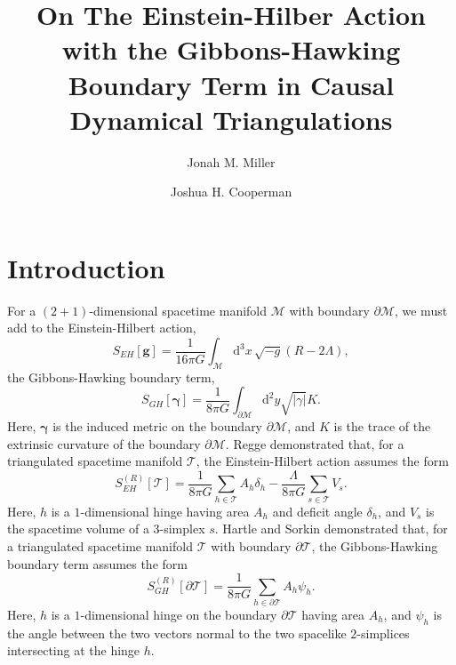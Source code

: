 \documentclass{article}
\title{On The Einstein-Hilber Action with the Gibbons-Hawking Boundary Term in Causal Dynamical Triangulations}
\author{Jonah M. Miller
 \and 
Joshua H. Cooperman}
\begin{document}
\maketitle

\section{Introduction}
For a $(2+1)$-dimensional spacetime manifold $\mathcal{M}$ with
boundary $\partial\mathcal{M}$, we must add to the Einstein-Hilbert
action,
\begin{equation}\label{EHaction}
S_{EH}[\mathbf{g}]=\frac{1}{16\pi G}\int_{\mathcal{M}}\mathrm{d}^{3}x\,\sqrt{-g}\left(R-2\Lambda\right),
\end{equation}
the Gibbons-Hawking boundary term,
\begin{equation}
S_{GH}[\mathbf{\gamma}]=\frac{1}{8\pi G}\int_{\partial\mathcal{M}}\mathrm{d}^{2}y\sqrt{|\gamma|}K.
\end{equation}
Here, $\mathbf{\gamma}$ is the induced metric on the boundary
$\partial\mathcal{M}$, and $K$ is the trace of the extrinsic curvature
of the boundary $\partial\mathcal{M}$. Regge demonstrated that, for a
triangulated spacetime manifold $\mathcal{T}$, the Einstein-Hilbert
action assumes the form
\begin{equation}\label{Reggeaction}
S_{EH}^{(R)}[\mathcal{T}]=\frac{1}{8\pi G}\sum_{h\in\mathcal{T}}A_{h}\delta_{h}-\frac{\Lambda}{8\pi G}\sum_{s\in\mathcal{T}}V_{s}.
\end{equation}
Here, $h$ is a $1$-dimensional hinge having area $A_{h}$ and deficit
angle $\delta_{h}$, and $V_{s}$ is the spacetime volume of a
$3$-simplex $s$. Hartle and Sorkin demonstrated that, for a
triangulated spacetime manifold $\mathcal{T}$ with boundary
$\partial\mathcal{T}$, the Gibbons-Hawking boundary term assumes the
form
\begin{equation}
S_{GH}^{(R)}[\partial\mathcal{T}]=\frac{1}{8\pi G}\sum_{h\in\partial\mathcal{T}}A_{h}\psi_{h}.
\end{equation}
Here, $h$ is a $1$-dimensional hinge on the boundary
$\partial\mathcal{T}$ having area $A_{h}$, and $\psi_{h}$ is the angle
between the two vectors normal to the two spacelike $2$-simplices
intersecting at the hinge $h$.
\end{document}
